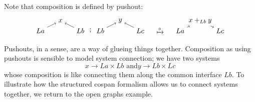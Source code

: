 \documentclass{amsart}
\renewcommand{\t}[1]{\text{#1}}
\newcommand{\csp}[3]{#2 \to #1 \times #3}
\theoremstyle{remark}
\theoremstyle{definition}
\begin{document}
Note that composition is defined by pushout:
%
\[
  \begin{tikzpicture}
    \begin{scope}
    \node (1) at (0,0) {\( La \)};
    \node (2) at (1,0.5) {\( x \)};
    \node (3) at (2,0) {\( Lb \)};
    \node (4) at (3,0) {\( Lb \)};
    \node (5) at (4,0.5) {\( y \)};
    \node (6) at (5,0) {\( Lc \)};
    \node (7) at (2.5,0) {\( ; \)};
    \draw [->] (1) to node [] {\scriptsize{\(  \)}} (2);
    \draw [->] (3) to node [] {\scriptsize{\(  \)}} (2);
    \draw [->] (4) to node [] {\scriptsize{\(  \)}} (5);
    \draw [->] (6) to node [] {\scriptsize{\(  \)}} (5);
    \end{scope}
    \begin{scope}[shift={(6,0)}]
    \node (1) at (0,0) {\( \xmapsto{\circ} \)};
    \end{scope}
    \begin{scope}[shift={(7,0)}]
    \node (1) at (0,0) {\( La \)};
    \node (2) at (1,0.5) {\( x +_{Lb} y \)};
    \node (3) at (2,0) {\( Lc \)};
     \draw [->] (1) to node [] {\scriptsize{\(  \)}} (2);
    \draw [->] (2) to node [] {\scriptsize{\(  \)}} (3); 
    \end{scope}
  \end{tikzpicture}
\]
% 

Pushouts, in a sense, are a way of glueing things
together. Composition as using pushouts is sensible to model
system connection; we have two systems
%
\[
  \csp{La}{x}{Lb}
  \t{ and}
  \csp{Lb}{y}{Lc}
\]
% 
whose composition is like connecting them along the common interface
$ Lb $. To illustrate how the structured cospan formalism allows us to connect
systems together, we return to the open graphs example.
\end{document}
